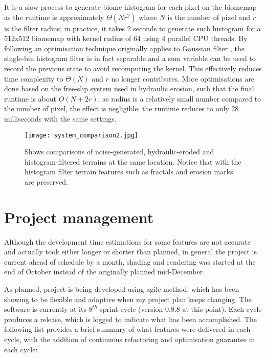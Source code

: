 \documentclass[oneside, a4paper]{article}
\begin{document}
    It is a slow process to generate biome histogram for each pixel on the biomemap as the runtime is approximately \(\Theta (Nr^{2})\) where \(N\) is the number of pixel and \(r\) is the filter radius; in practice, it takes 2 seconds to generate such histogram for a 512x512 biomemap with kernel radius of 64 using 4 parallel CPU threads. By following an optimisation technique originally applies to Gaussian filter \cite{fast_gaussian}, the single-bin histogram filter is in fact separable and a sum variable can be used to record the previous state to avoid recomputing the kernel. This effectively reduces time complexity to \(\Theta (N)\) and \(r\) no longer contributes. More optimisations are done based on the free-slip system used in hydraulic erosion, such that the final runtime is about \(O (N + 2r)\); as radius is a relatively small number compared to the number of pixel, the effect is negligible; the runtime reduces to only 28 milliseconds with the same settings.

    \begin{figure}[H]
        \texttt{[image: system\_comparison2.jpg]}
        \caption{Shows comparisons of noise-generated, hydraulic-eroded and histogram-filtered terrains at the same location. Notice that with the histogram filter terrain features such as fractals and erosion marks are preserved.}
    \end{figure}

    \section{Project management}
    Although the development time estimations for some features are not accurate and actually took either longer or shorter than planned, in general the project is current ahead of schedule by a month, shading and rendering was started at the end of October instead of the originally planned mid-December.

    As planned, project is being developed using agile method, which has been showing to be flexible and adaptive when my project plan keeps changing. The software is currently at its \(8^{th}\) sprint cycle (version 0.8.8 at this point). Each cycle produces a release, which is logged to indicate what has been accomplished. The following list provides a brief summary of what features were delivered in each cycle, with the addition of continuous refactoring and optimisation guarantee in each cycle:
\end{document}
